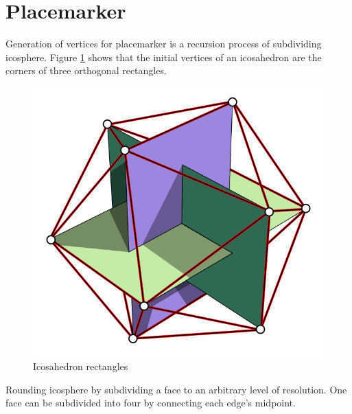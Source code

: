 \section{Placemarker}

Generation of vertices for placemarker is a recursion process of subdividing icosphere. Figure \ref{fig:icosahedron-rectangles} shows that the initial vertices of an icosahedron are the corners of three orthogonal rectangles.

\begin{figure}[H]
\caption[Icosahedron rectangles]{Icosahedron rectangles \cite{wiki.icosahedron-rectangles.2006}}
\label{fig:icosahedron-rectangles}
\centering
\includegraphics[width=\linewidth]{Figures/icosahedron-rectangles.png}
\decoRule
\end{figure}

Rounding icosphere by subdividing a face to an arbitrary level of resolution. One face can be subdivided into four by connecting each edge's midpoint.

